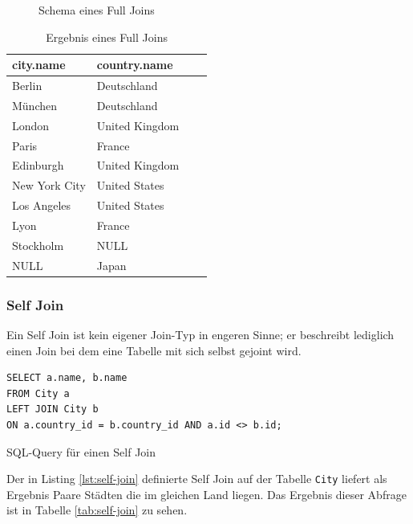 \documentclass[a4paper]{article}
\begin{document}
\begin{minipage}{\textwidth}
\begin{minipage}[b]{0.49\textwidth}
\begin{figure}[H]
\begin{tabular}{| c | c |}
  \end{tabular}
\caption{Schema eines Full Joins}
\end{figure}
\end{minipage}
\hfill
\begin{minipage}[b]{0.49\textwidth}
\begin{table}[H]
\centering
  \begin{tabular}{| l | l | l | l |}
    \hline
    city.name & country.name\\ \hline
    \hline
   Berlin & Deutschland \\ \hline
   München & Deutschland \\ \hline
   London & United Kingdom \\ \hline
   Paris & France \\ \hline
   Edinburgh & United Kingdom \\ \hline
   New York City & United States \\ \hline
   Los Angeles & United States \\ \hline
   Lyon & France \\ \hline
   Stockholm & NULL \\ \hline
   NULL & Japan \\ \hline
  \end{tabular}
\caption{Ergebnis eines Full Joins}
\label{tab:full-join}
\end{table}
\end{minipage}
\end{minipage}

\newpage
\subsubsection{Self Join}
Ein Self Join ist kein eigener Join-Typ in engeren Sinne; er beschreibt lediglich einen Join bei dem eine Tabelle mit sich selbst gejoint wird.

\begin{listing}[H]
\begin{verbatim}
SELECT a.name, b.name 
FROM City a
LEFT JOIN City b
ON a.country_id = b.country_id AND a.id <> b.id;
\end{verbatim}
\caption{SQL-Query für einen Self Join}
\label{lst:self-join}
\end{listing}

Der in Listing \ref{lst:self-join} definierte Self Join auf der Tabelle \texttt{City} liefert als Ergebnis Paare Städten die im gleichen Land liegen. Das Ergebnis dieser Abfrage ist in Tabelle \ref{tab:self-join} zu sehen.
\end{document}
